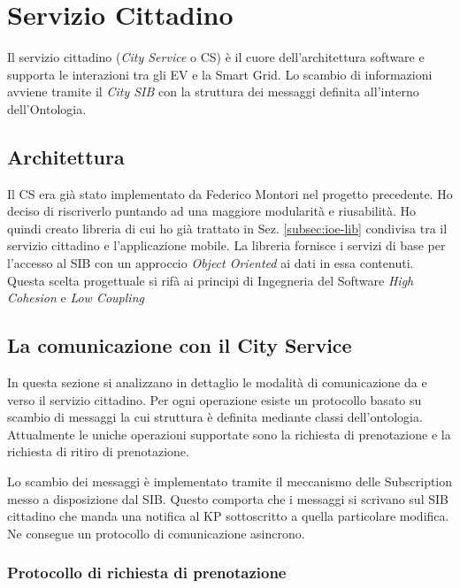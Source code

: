 \section{Servizio Cittadino}

Il servizio cittadino (\emph{City Service} o CS) è il cuore dell'architettura software e supporta le interazioni tra gli EV e la Smart Grid. Lo scambio di informazioni avviene tramite il \emph{City SIB} con la struttura dei messaggi definita all'interno dell'Ontologia. 

\subsection{Architettura}

Il CS era già stato implementato da Federico Montori nel progetto precedente. Ho deciso di riscriverlo puntando ad una maggiore modularità e riusabilità. Ho quindi creato libreria di cui ho già trattato in Sez. \ref{subsec:ioe-lib} condivisa tra il servizio cittadino e l'applicazione mobile. La libreria fornisce i servizi di base per l'accesso al SIB con un approccio \emph{Object Oriented} ai dati in essa contenuti. Questa scelta progettuale si rifà ai principi di Ingegneria del Software \emph{High Cohesion} e \emph{Low Coupling} \cite{larcab2005}

\subsection{La comunicazione con il City Service}\label{sec:protocol}

In questa sezione si analizzano in dettaglio le modalità di comunicazione da e verso il servizio cittadino. Per ogni operazione esiste un protocollo basato su scambio di messaggi la cui struttura è definita mediante classi dell'ontologia. Attualmente le uniche operazioni supportate sono la richiesta di prenotazione e la richiesta di ritiro di prenotazione.

Lo scambio dei messaggi è implementato tramite il meccanismo delle Subscription messo a disposizione dal SIB. Questo comporta che i messaggi si scrivano sul SIB cittadino che manda una notifica al KP sottoscritto a quella particolare modifica. Ne consegue un protocollo di comunicazione asincrono.

\subsubsection{Protocollo di richiesta di prenotazione}

